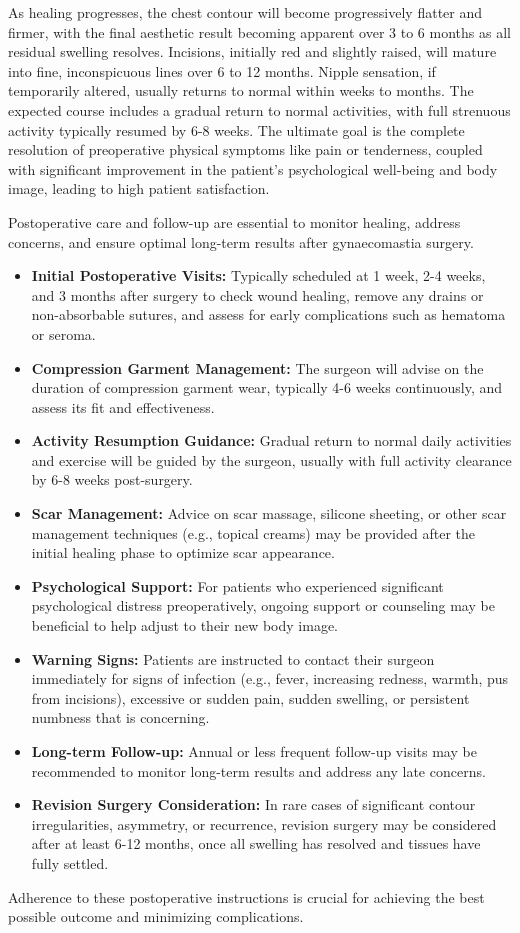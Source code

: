 As healing progresses, the chest contour will become progressively flatter and firmer, with the final aesthetic result becoming apparent over 3 to 6 months as all residual swelling resolves. Incisions, initially red and slightly raised, will mature into fine, inconspicuous lines over 6 to 12 months. Nipple sensation, if temporarily altered, usually returns to normal within weeks to months. The expected course includes a gradual return to normal activities, with full strenuous activity typically resumed by 6-8 weeks. The ultimate goal is the complete resolution of preoperative physical symptoms like pain or tenderness, coupled with significant improvement in the patient's psychological well-being and body image, leading to high patient satisfaction.

Postoperative care and follow-up are essential to monitor healing, address concerns, and ensure optimal long-term results after gynaecomastia surgery.

\begin{itemize}
  \item \textbf{Initial Postoperative Visits:} Typically scheduled at 1 week, 2-4 weeks, and 3 months after surgery to check wound healing, remove any drains or non-absorbable sutures, and assess for early complications such as hematoma or seroma.
  \item \textbf{Compression Garment Management:} The surgeon will advise on the duration of compression garment wear, typically 4-6 weeks continuously, and assess its fit and effectiveness.
  \item \textbf{Activity Resumption Guidance:} Gradual return to normal daily activities and exercise will be guided by the surgeon, usually with full activity clearance by 6-8 weeks post-surgery.
  \item \textbf{Scar Management:} Advice on scar massage, silicone sheeting, or other scar management techniques (e.g., topical creams) may be provided after the initial healing phase to optimize scar appearance.
  \item \textbf{Psychological Support:} For patients who experienced significant psychological distress preoperatively, ongoing support or counseling may be beneficial to help adjust to their new body image.
  \item \textbf{Warning Signs:} Patients are instructed to contact their surgeon immediately for signs of infection (e.g., fever, increasing redness, warmth, pus from incisions), excessive or sudden pain, sudden swelling, or persistent numbness that is concerning.
  \item \textbf{Long-term Follow-up:} Annual or less frequent follow-up visits may be recommended to monitor long-term results and address any late concerns.
\item \textbf{Revision Surgery Consideration:} In rare cases of significant contour irregularities, asymmetry, or recurrence, revision surgery may be considered after at least 6-12 months, once all swelling has resolved and tissues have fully settled.
\end{itemize}
Adherence to these postoperative instructions is crucial for achieving the best possible outcome and minimizing complications.

